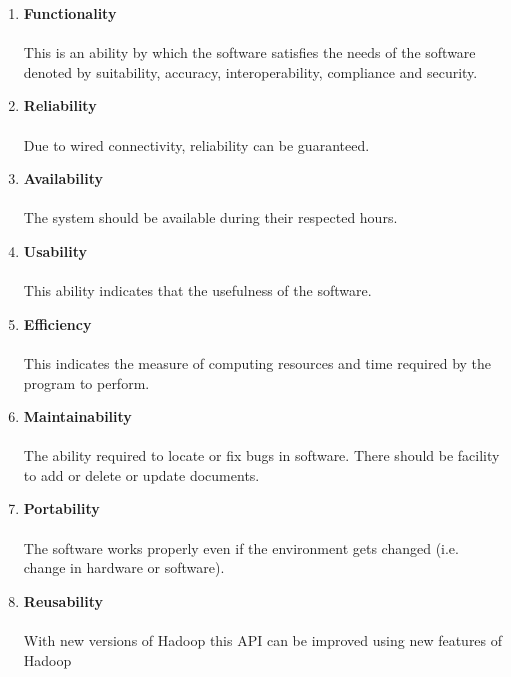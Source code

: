 \documentclass[11pt,letterpaper]{article}
\begin{document}
\begin{enumerate}
\item \textbf{Functionality}
\paragraph{}
This is an ability by which the software satisfies the needs of the software denoted by suitability, accuracy, interoperability, compliance and security.

\item \textbf{Reliability}
\paragraph{}
Due to wired connectivity, reliability can be guaranteed.

\item \textbf{Availability}
\paragraph{}
The system should be available during their respected hours.

\item \textbf{Usability}
\paragraph{}
This ability indicates that the usefulness of the software.

\item \textbf{Efficiency}
\paragraph{}    
This indicates the measure of computing resources and time required by the program to perform.

\item \textbf{Maintainability}
\paragraph{}
The ability required to locate or fix bugs in software. There should be facility to add or delete or update documents.

\item \textbf{Portability}
\paragraph{}
The software works properly even if the environment gets changed (i.e. change in hardware or software).

\item \textbf{Reusability}
\paragraph{}
With new versions of Hadoop this API can be improved using new features of Hadoop

\end{enumerate}
\end{document}
